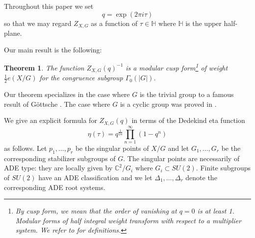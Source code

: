 \documentclass{amsart}
\newtheorem{theorem}{Theorem}[section]
\theoremstyle{definition}
\newcommand{\half}{\frac{1}{2}}
\newcommand{\CC} {{\mathbb C}}          %
\newcommand{\HH}{\mathbb{H}}
\begin{document}
Throughout this paper we set
\[
q=\exp\left(2\pi i \tau  \right)
\]
so that we may regard $Z_{X,G}$ as a function of $\tau \in \HH$ where
$\HH$ is the upper half-plane.

Our main result is the following:

\begin{theorem}
\label{thm:main} The function $Z_{X,G}(q)^{-1}$ is a modular cusp
form\footnote{By cusp form, we mean that the order of vanishing at
$q=0$ is at least 1. Modular forms of half integral weight transform with
respect to a multiplier system. We refer to \cite{kohler2011eta} for
definitions.} of weight $\half e(X/G)$ for the congruence subgroup
$\Gamma_{0}(|G|)$.
\end{theorem}
   

Our theorem specializes in the case where $G$ is the trivial group to
a famous result of G\"ottsche \cite{gottsche1990betti}. The case where
$G$ is a cyclic group was proved in \cite{bryan2018chl}.


We give an explicit formula for $Z_{X,G}(q)$ in terms of the
Dedekind eta function
\[
\eta (\tau ) = q^{\frac{1}{24}}\prod_{n=1}^{\infty} (1-q^{n})
\]
as follows. Let $p_{1},\dots ,p_{r}$ be the singular points of $X/G$
and let $G_{1},\dots ,G_{r}$ be the corresponding stabilizer subgroups
of $G$. The singular points are necessarily of ADE type: they are
locally given by $\CC^{2}/G_{i}$ where $G_{i}\subset SU(2)$. Finite
subgroups of $SU(2)$ have an ADE classification and we let
$\Delta_{1},\dots ,\Delta_{r}$ denote the corresponding ADE root
systems.
\end{document}
